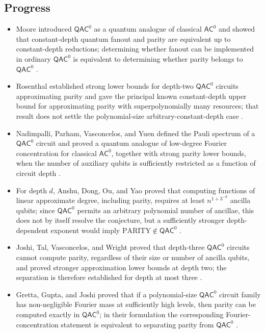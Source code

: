 \subsection*{Progress}

\begin{itemize}
  \item Moore introduced $\mathsf{QAC}^0$ as a quantum analogue of classical
$\mathsf{AC}^0$ and showed that constant-depth quantum fanout and parity are
equivalent up to constant-depth reductions; determining whether fanout can be
implemented in ordinary $\mathsf{QAC}^0$ is equivalent to determining whether
parity belongs to $\mathsf{QAC}^0$
.

  \item Rosenthal established strong lower bounds for depth-two $\mathsf{QAC}^0$
circuits approximating parity and gave the principal known constant-depth
upper bound for approximating parity with superpolynomially many resources;
that result does not settle the polynomial-size arbitrary-constant-depth case
.

  \item Nadimpalli, Parham, Vasconcelos, and Yuen defined the Pauli spectrum of a
$\mathsf{QAC}^0$ circuit and proved a quantum analogue of low-degree Fourier
concentration for classical $\mathsf{AC}^0$, together with strong parity
lower bounds, when the number of auxiliary qubits is sufficiently restricted
as a function of circuit depth
.

  \item For depth $d$, Anshu, Dong, Ou, and Yao proved that computing functions of
linear approximate degree, including parity, requires at least
$n^{1+3^{-d}}$ ancilla qubits; since $\mathsf{QAC}^0$ permits an arbitrary
polynomial number of ancillae, this does not by itself resolve the
conjecture, but a sufficiently stronger depth-dependent exponent would imply
$\mathrm{PARITY}\notin\mathsf{QAC}^0$
.

  \item Joshi, Tal, Vasconcelos, and Wright proved that depth-three $\mathsf{QAC}^0$
circuits cannot compute parity, regardless of their size or number of ancilla
qubits, and proved stronger approximation lower bounds at depth two; the
separation is therefore established for depth at most three
.

  \item Gretta, Gupta, and Joshi proved that if a polynomial-size $\mathsf{QAC}^0$
circuit family has non-negligible Fourier mass at sufficiently high levels, then
parity can be computed exactly in $\mathsf{QAC}^0$; in their formulation the
corresponding Fourier-concentration statement is equivalent to separating
parity from $\mathsf{QAC}^0$
.


\end{itemize}
